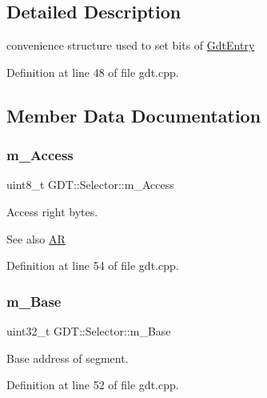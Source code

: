 \subsection{Detailed Description}
convenience structure used to set bits of \hyperlink{union_g_d_t_1_1_gdt_entry}{Gdt\+Entry} 

Definition at line 48 of file gdt.\+cpp.



\subsection{Member Data Documentation}
\mbox{\label{struct_g_d_t_1_1_selector_aeba15cbab5fa33e66d06b136ece34ed3}} 
\subsubsection{\texorpdfstring{m\+\_\+\+Access}{m\_Access}}
{\footnotesize\ttfamily uint8\+\_\+t G\+D\+T\+::\+Selector\+::m\+\_\+\+Access}



Access right bytes. 

\begin{DoxySeeAlso}{See also}
\hyperlink{namespace_a_r}{AR} 
\end{DoxySeeAlso}


Definition at line 54 of file gdt.\+cpp.

\mbox{\label{struct_g_d_t_1_1_selector_ac98d387038fb7ad18aab22332cb6350c}} 
\subsubsection{\texorpdfstring{m\+\_\+\+Base}{m\_Base}}
{\footnotesize\ttfamily uint32\+\_\+t G\+D\+T\+::\+Selector\+::m\+\_\+\+Base}



Base address of segment. 



Definition at line 52 of file gdt.\+cpp.

\mbox{\label{struct_g_d_t_1_1_selector_a7b5d40047c58c483e74a9037418c2203}} 
